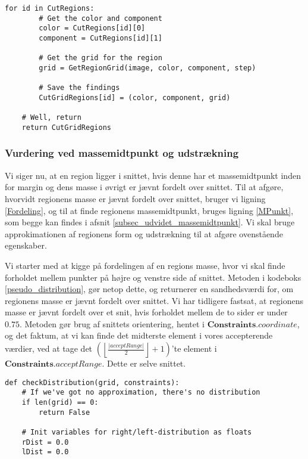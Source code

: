 {\begin{lstlisting}[caption={Metode, som finder approksimationen til alle
    regioner i en instans af $\angles{CutRegions}$.}, captionpos=b,
    label={pseudo_GridIt}, frame=tb,
    breaklines=false, float=t]
    for id in CutRegions:
        # Get the color and component
        color = CutRegions[id][0]
        component = CutRegions[id][1]

        # Get the grid for the region
        grid = GetRegionGrid(image, color, component, step)

        # Save the findings
        CutGridRegions[id] = (color, component, grid)

    # Well, return
    return CutGridRegions
\end{lstlisting}

\subsubsection{Vurdering ved massemidtpunkt og udstrækning}
Vi siger nu, at en region ligger i snittet, hvis denne har et
massemidtpunkt inden for margin og dens masse i øvrigt er jævnt fordelt
over snittet. Til at afgøre, hvorvidt regionens masse er jævnt fordelt
over snittet, bruger vi ligning \eqref{Fordeling}, og til at finde
regionens massemidtpunkt, bruges ligning \eqref{MPunkt}, som begge kan
findes i afsnit \ref{subsec_udvidet_massemidtpunkt}. Vi skal bruge
approkimationen af regionens form og udstrækning til at afgøre
ovenstående egenskaber.

Vi starter med at kigge på fordelingen af en regions masse, hvor vi skal
finde forholdet mellem punkter på højre og venstre side af snittet.
Metoden i kodeboks \ref{pseudo_distribution}, gør netop dette, og
returnerer en sandhedsværdi for, om regionens masse er jævnt fordelt
over snittet. Vi har tidligere fastsat, at regionens masse er jævnt
fordelt over et snit, hvis forholdet mellem de to sider er under $0.75$.
Metoden gør brug af snittets orientering, hentet i
$\textbf{Constraints}.\textit{coordinate}$, og det faktum, at vi kan
finde det midterste element i vores accepterende værdier, ved at tage
det $\left(\left\lfloor \frac{|\textit{acceptRange}|}{2}\right\rfloor +
1\right)$'te element i $\textbf{Constraints}.\textit{acceptRange}$.
Dette er selve snittet.

\begin{lstlisting}[caption={Metode som, på baggrund af regionens
    fordeling af masse, afgør, om denne region er jævnt fordelt},
    captionpos=b, label={pseudo_distribution}, frame=tb,
    breaklines=false, float=t]
def checkDistribution(grid, constraints):
    # If we've got no approximation, there's no distribution
    if len(grid) == 0:
        return False

    # Init variables for right/left-distribution as floats
    rDist = 0.0
    lDist = 0.0


\end{lstlisting}}
